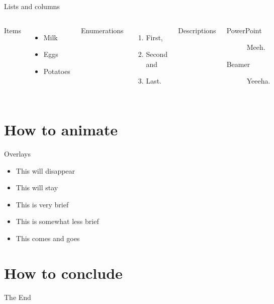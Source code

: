 \documentclass{beamer}
\begin{document}
\begin{frame}{Lists and columns}
  \begin{columns}[T, %
    onlytextwidth] %
    Items
    \begin{itemize}
    \item Milk
    \item Eggs
    \item Potatoes
    \end{itemize}

    Enumerations
    \begin{enumerate}
    \item First,
    \item Second and
    \item Last.
    \end{enumerate}

    Descriptions
    \begin{description}
    \item[PowerPoint] Meeh.
    \item[Beamer] Yeeeha.
    \end{description}
  \end{columns}
\end{frame}


\section{How to animate}

\begin{frame}{Overlays}
  \begin{itemize}
  \item<-2> This will disappear
  \item<2-> This will \alert<5->{stay}
  \item<3> This is very brief
  \item<3-4> This is somewhat less brief
  \item<2,4> This comes and goes
  \end{itemize}
\end{frame}

\section{How to conclude}

\begin{frame}[noframenumbering] %
  \centering{}\Huge
  The End
\end{frame}
\end{document}
